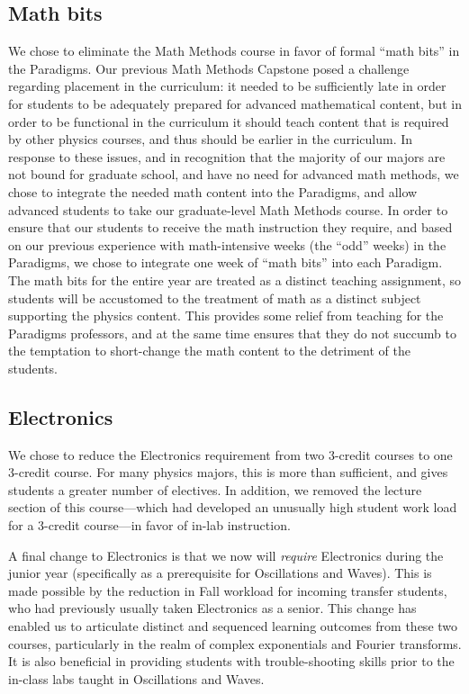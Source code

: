 \documentclass[english,aps,pra,reprint,noshowpacs,superscriptaddress]{revtex4-1}
\begin{document}
\subsection{Math bits}
We chose to eliminate the Math Methods course in favor of formal
``math bits'' in the Paradigms.  Our previous Math Methods Capstone
posed a challenge regarding placement in the curriculum: it needed to
be sufficiently late in order for students to be adequately prepared
for advanced mathematical content, but in order to be functional in
the curriculum it should teach content that is required by other
physics courses, and thus should be earlier in the curriculum.  In
response to these issues, and in recognition that the majority of our
majors are not bound for graduate school, and have no need for
advanced math methods, we chose to integrate the needed math content
into the Paradigms, and allow advanced students to take our
graduate-level Math Methods course.  In order to ensure that our
students to receive the math instruction they require, and based on
our previous experience with math-intensive weeks (the ``odd'' weeks)
in the Paradigms, we chose to integrate one week of ``math bits'' into
each Paradigm.  The math bits for the entire year are treated as a
distinct teaching assignment, so students will be accustomed to the
treatment of math as a distinct subject supporting the physics
content.  This provides some relief from teaching for the Paradigms
professors, and at the same time ensures that they do not succumb to
the temptation to short-change the math content to the detriment of
the students.

\subsection{Electronics}
We chose to reduce the Electronics requirement from two 3-credit
courses to one 3-credit course.  For many physics majors, this is more
than sufficient, and gives students a greater number of electives.  In
addition, we removed the lecture section of this course---which had
developed an unusually high student work load for a 3-credit
course---in favor of in-lab instruction.

A final change to Electronics is that we now will \emph{require}
Electronics during the junior year (specifically as a prerequisite for
Oscillations and Waves).  This is made possible by the reduction in
Fall workload for incoming transfer students, who had previously
usually taken Electronics as a senior.  This change has enabled us to
articulate distinct and sequenced learning outcomes from these two
courses, particularly in the realm of complex exponentials and Fourier
transforms.  It is also beneficial in providing students with
trouble-shooting skills prior to the in-class labs taught in
Oscillations and Waves.
\end{document}
